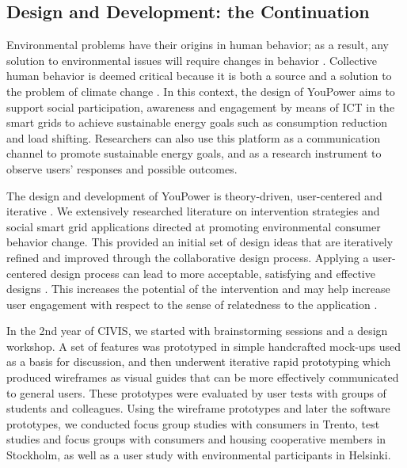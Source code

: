 \subsection{Design and Development: the Continuation}

Environmental problems have their origins in human behavior; as a result, any solution to environmental issues will require changes in behavior 
\citep{Schultz2014}.
Collective human behavior is deemed critical because it is both a source and a solution to the problem of climate change \citep{Masson2014}.
In this context, the design of YouPower aims to support social participation, awareness and engagement by means of ICT in the smart grids to achieve sustainable energy goals such as consumption reduction and load shifting. Researchers can also use this platform as a communication channel to promote sustainable energy goals, and as a research instrument to observe users' responses and possible outcomes. 



The design and development of YouPower is theory-driven, user-centered and iterative \citep{Leffingwell2000,Leffingwell2011}. We extensively researched literature on intervention strategies and social smart grid applications directed at promoting environmental consumer behavior change. This provided an initial set of design ideas that are iteratively refined and improved through the collaborative design process. Applying a user-centered design process can lead to more acceptable, satisfying and effective designs \citep{Brynjarsdottir2012}. This increases the potential of the intervention \citep{dick2012empowering} and may help increase user engagement with respect to the sense of relatedness to the application \citep{pierce2003state,schwartz2015people,edward2015review}. 

In the 2nd year of CIVIS, we started with brainstorming sessions and a design workshop. A set of features was prototyped in simple handcrafted mock-ups used as a basis for discussion, and then underwent iterative rapid prototyping which produced wireframes as visual guides that can be more effectively communicated to general users. These prototypes were evaluated by user tests with groups of students and colleagues. Using the wireframe prototypes and later the software prototypes, we conducted focus group studies with consumers in Trento, test studies and focus groups with consumers and housing cooperative members in Stockholm, as well as a user study with environmental participants in Helsinki. 

